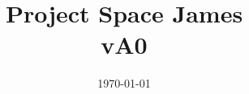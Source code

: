\documentclass[a4paper,12pt,oneside]{book}
\begin{document}
\renewcommand{\thepage}{\arabic{page}}

\title{Project Space James\\vA0}
\date{\today}

\frontmatter
\maketitle
\tableofcontents
\mainmatter
















\clearpage

\printendnotes
\end{document}
